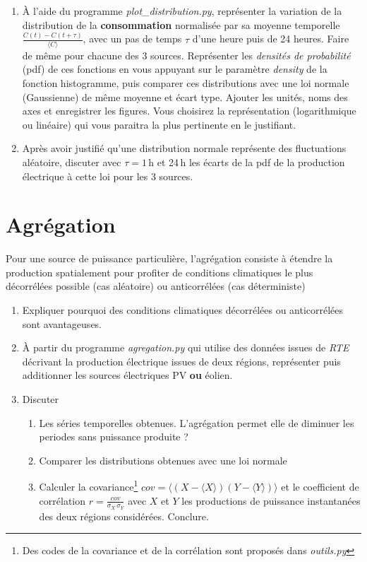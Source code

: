 \documentclass[12pt,a4,french]{article}
\newcommand{\tmtextbf}[1]{{\bfseries{#1}}}
\newcommand{\tmtextit}[1]{{\itshape{#1}}}
\begin{document}
\begin{enumerate}
  \item À l'aide du programme \tmtextit{plot\_distribution.py}, représenter
  la variation de la distribution de la \tmtextbf{consommation} normalisée
  par sa moyenne temporelle $\frac{C (t) - C (t + \tau)}{\langle C \rangle}$,
  avec un pas de temps $\tau$ d'une heure puis de 24 heures. Faire de même
  pour chacune des 3 sources. Représenter les \tmtextit{densités de probabilité}
  (pdf) de ces fonctions en vous appuyant sur le paramètre \tmtextit{density}
  de la fonction histogramme, puis comparer ces distributions avec une loi
  normale (Gaussienne) de même moyenne et écart type. Ajouter les unités,
  noms des axes et enregistrer les figures. Vous choisirez la représentation
  (logarithmique ou linéaire) qui vous paraitra la plus pertinente en le justifiant.
  
  \item Après avoir justifié qu'une distribution normale représente des
  fluctuations aléatoire, discuter avec $\tau = 1$\,h et 24\,h les écarts de la
  pdf de la production électrique à cette loi pour les 3 sources.
\end{enumerate}

\section{Agrégation}

Pour une source de puissance particulière, l'agrégation consiste à étendre la production spatialement pour profiter de conditions climatiques le plus décorrélées possible (cas aléatoire) ou anticorrélées (cas déterministe)
\begin{enumerate}
	\item Expliquer pourquoi des conditions climatiques décorrélées ou anticorrélées sont avantageuses.
	
  \item À partir du programme \tmtextit{agregation.py} qui utilise des
  données issues de \tmtextit{RTE} décrivant la production électrique
  issues de deux régions, représenter puis additionner les sources
  électriques PV \textbf{ou} éolien.
  
  \item Discuter
  \begin{enumerate}
    \item Les séries temporelles obtenues. L'agrégation permet elle de
    diminuer les periodes sans puissance produite ?
    
    \item Comparer les distributions obtenues avec une loi normale
    
    \item Calculer la covariance\footnote{Des codes de la covariance et de la corrélation sont proposés dans \textit{outils.py}} $cov=\langle (X-\langle X \rangle)(Y - \langle Y \rangle)\rangle $ et le coefficient de corrélation $r=\frac{cov}{\sigma_X \, \sigma_Y}$ avec $X$ et $Y$ les productions de puissance instantanées des deux régions considérées. Conclure.
  \end{enumerate}
\end{enumerate}
\end{document}
